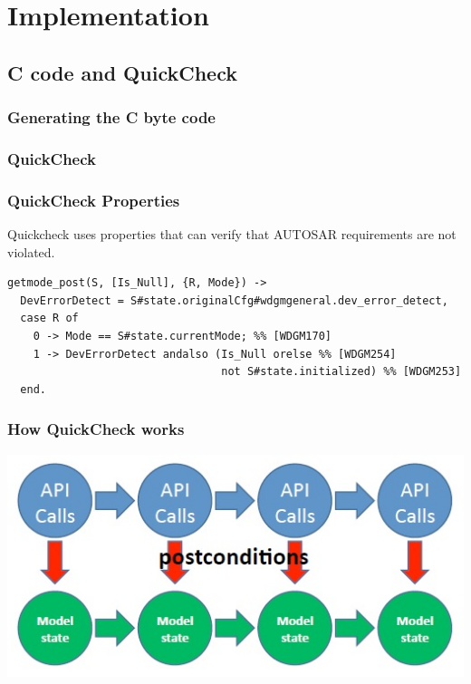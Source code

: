\documentclass{beamer}
\begin{document}
\section{Implementation}
\subsection{C code and QuickCheck}
\begin{frame}
  \frametitle{Generating the C byte code}
  
\end{frame}

\begin{frame}
        \frametitle{QuickCheck}
\end{frame}

%   

\newcommand\Fontvi{\fontsize{6}{7.2}\selectfont}
\begin{frame}[fragile]
        \frametitle{QuickCheck Properties}
Quickcheck uses properties that can verify that AUTOSAR requirements are not
violated.
        \Fontvi
        \begin{lstlisting}[style=erlang]
getmode_post(S, [Is_Null], {R, Mode}) ->
  DevErrorDetect = S#state.originalCfg#wdgmgeneral.dev_error_detect,
  case R of
    0 -> Mode == S#state.currentMode; %% [WDGM170]
    1 -> DevErrorDetect andalso (Is_Null orelse %% [WDGM254]
                                 not S#state.initialized) %% [WDGM253]
  end.
        \end{lstlisting}
\end{frame}


\begin{frame}
  \frametitle{How QuickCheck works}
  \centerline{
    \includegraphics[keepaspectratio, width=0.7\linewidth]{api_calls}
  }
\end{frame}
\end{document}
